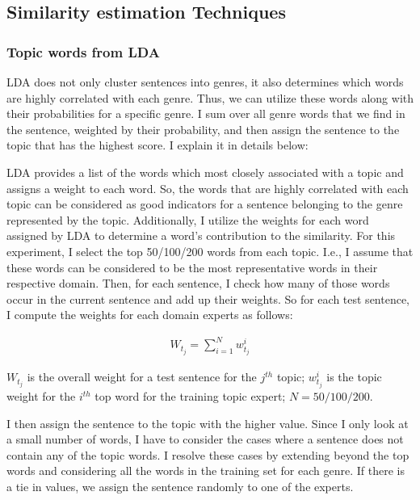 \subsection{Similarity estimation Techniques}

\subsubsection{Topic words from LDA }
	
LDA does not only cluster sentences into genres, it also determines which words are highly correlated with each genre. Thus, we can utilize these words along with their probabilities for a specific genre. I sum over all genre words that we find in the sentence, weighted by their probability, and then assign the sentence to the topic that has the highest score. I explain it in details below:

LDA provides a list of the words  which most closely associated with a topic and assigns a weight to each word.  So, the words that are highly correlated with each topic can be considered as good indicators for a sentence belonging to the genre represented by the topic. Additionally, I utilize the weights for each word assigned by LDA to determine a word's contribution to the similarity. For this experiment, I select the top 50/100/200 words from each topic. I.e., I assume that these words can be considered to be the most representative  words in their respective domain. Then, for each sentence, I check how many of those words occur in the current sentence and add up their weights. So for each test sentence, I compute the weights for each domain experts as follows: 

\begin{align}
    W_{t_j} = \sum_{i=1}^{N} w_{t_j}^{i}
\end{align}

$W_{t_j}$ is the overall weight for a test sentence for the $j^{th}$ topic; $w_{t_j}^{i}$ is the topic weight for the $i^{th}$ top word for the training topic expert; $N = 50/100/200$.

I then assign the sentence to the topic with the higher value. Since I only look at a small number of words, I have to consider the cases where a sentence does not contain any of the topic words. I resolve these cases by extending beyond the top  words and considering all the words in the training set for each genre. If there is a tie in values, we assign the sentence randomly to one of the experts. %

